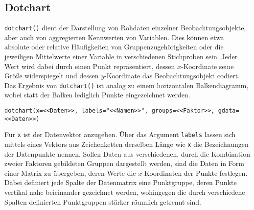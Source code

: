 \subsection{Dotchart}

\lstinline!dotchart()! dient der Darstellung von Rohdaten einzelner Beobachtungsobjekte, aber auch von aggregierten Kennwerten von Variablen. Dies können etwa absolute oder relative Häufigkeiten von Gruppenzugehörigkeiten oder die jeweiligen Mittelwerte einer Variable in verschiedenen Stichproben sein. Jeder Wert wird dabei durch einen Punkt repräsentiert, dessen $x$-Koordinate seine Größe widerspiegelt und dessen $y$-Koordinate das Beobachtungsobjekt codiert. Das Ergebnis von \lstinline!dotchart()! ist analog zu einem horizontalen Balkendiagramm, wobei statt der Balken lediglich Punkte eingezeichnet werden.
\begin{lstlisting}
dotchart(x=<<Daten>>, labels="<<Namen>>", groups=<<Faktor>>, gdata=<<Daten>>)
\end{lstlisting}

Für \lstinline!x! ist der Datenvektor anzugeben. Über das Argument \lstinline!labels! lassen sich mittels eines Vektors aus Zeichenketten derselben Länge wie \lstinline!x! die Bezeichnungen der Datenpunkte nennen. Sollen Daten aus verschiedenen, durch die Kombination zweier Faktoren gebildeten Gruppen dargestellt werden, sind die Daten in Form einer Matrix zu übergeben, deren Werte die $x$-Koordinaten der Punkte festlegen. Dabei definiert jede Spalte der Datenmatrix eine Punktgruppe, deren Punkte vertikal nahe beieinander gezeichnet werden, wohingegen die durch verschiedene Spalten definierten Punktgruppen stärker räumlich getrennt sind.

